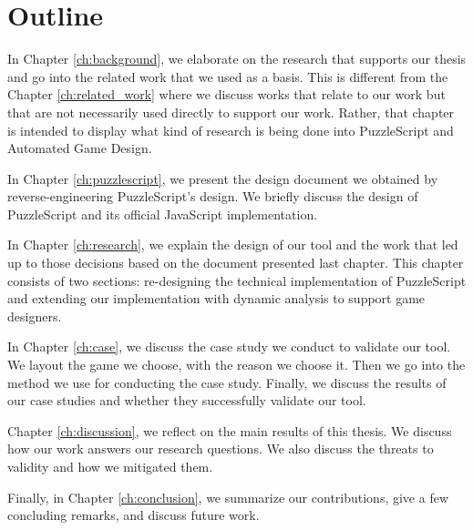 \section{Outline}

In Chapter \ref{ch:background}, we elaborate on the research that supports our thesis and go into the related work that we used as a basis. This is different from the Chapter \ref{ch:related_work} where we discuss works that relate to our work but that are not necessarily used directly to support our work. Rather, that chapter is intended to display what kind of research is being done into PuzzleScript and Automated Game Design.

In Chapter \ref{ch:puzzlescript}, we present the design document we obtained by reverse-engineering PuzzleScript's design. We briefly discuss the design of PuzzleScript and its official JavaScript implementation.

In Chapter \ref{ch:research}, we explain the design of our tool and the work that led up to those decisions based on the document presented last chapter. This chapter consists of two sections: re-designing the technical implementation of PuzzleScript and extending our implementation with dynamic analysis to support game designers.

In Chapter \ref{ch:case}, we discuss the case study we conduct to validate our tool. We layout the game we choose, with the reason we choose it. Then we go into the method we use for conducting the case study. Finally, we discuss the results of our case studies and whether they successfully validate our tool. 

Chapter \ref{ch:discussion}, we reflect on the main results of this thesis. We discuss how our work answers our research questions. We also discuss the threats to validity and how we mitigated them.

Finally, in Chapter \ref{ch:conclusion}, we summarize our contributions, give a few concluding remarks, and discuss future work.

